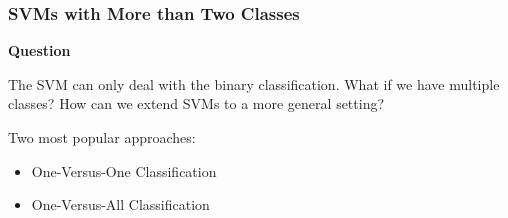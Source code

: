 \documentclass{beamer}
\begin{document}


\begin{frame}
    \frametitle{SVMs with More than Two Classes}
    \textbf{Question}

    The SVM can only deal with the binary classification. 
    What if we have multiple classes? How can we extend SVMs 
    to a more general setting?

    Two most popular approaches:
    \begin{itemize}
        \item One-Versus-One Classification
        \item One-Versus-All Classification
    \end{itemize}
\end{frame}
\end{document}
